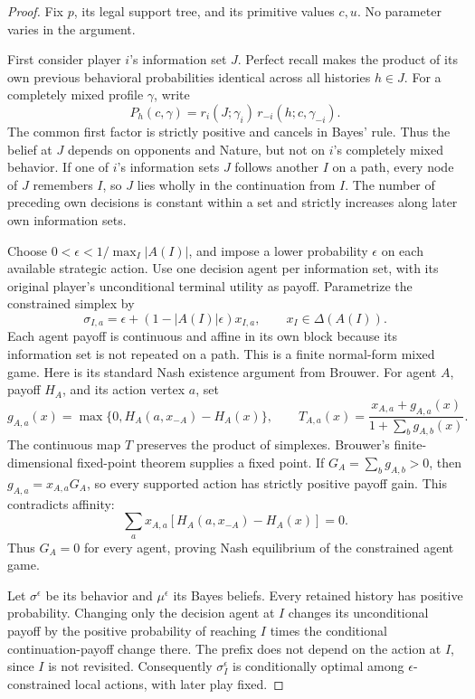 \documentclass[11pt,a4paper]{article}
\numberwithin{equation}{section}
\theoremstyle{definition}
\begin{document}
\begin{proof}
Fix \(p\), its legal support tree, and its primitive values \(c,u\).
No parameter varies in the argument.

First consider player \(i\)'s information set \(J\).
Perfect recall makes the product of its own previous behavioral
probabilities identical across all histories \(h\in J\).
For a completely mixed profile \(\gamma\), write
\[
 P_h(c,\gamma)
 =r_i(J;\gamma_i)\,r_{-i}(h;c,\gamma_{-i}).
\]
The common first factor is strictly positive and cancels in Bayes'
rule. Thus the belief at \(J\) depends on opponents and Nature, but
not on \(i\)'s completely mixed behavior.
If one of \(i\)'s information sets \(J\) follows another \(I\) on a
path, every node of \(J\) remembers \(I\), so \(J\) lies wholly in
the continuation from \(I\).
The number of preceding own decisions is constant within a set and
strictly increases along later own information sets.

Choose \(0<\epsilon<1/\max_I|A(I)|\), and impose a lower probability
\(\epsilon\) on each available strategic action.
Use one decision agent per information set, with its original
player's unconditional terminal utility as payoff.
Parametrize the constrained simplex by
\[
 \sigma_{I,a}=\epsilon+(1-|A(I)|\epsilon)x_{I,a},
 \qquad x_I\in\Delta(A(I)).
\]
Each agent payoff is continuous and affine in its own block because
its information set is not repeated on a path.
This is a finite normal-form mixed game.
Here is its standard Nash existence argument from Brouwer.
For agent \(A\), payoff \(H_A\), and its action vertex \(a\), set
\[
 g_{A,a}(x)=\max\{0,H_A(a,x_{-A})-H_A(x)\},\qquad
 T_{A,a}(x)=\frac{x_{A,a}+g_{A,a}(x)}
                   {1+\sum_b g_{A,b}(x)}.
\]
The continuous map \(T\) preserves the product of simplexes.
Brouwer's finite-dimensional fixed-point theorem supplies a fixed
point. If \(G_A=\sum_b g_{A,b}>0\), then
\(g_{A,a}=x_{A,a}G_A\), so every supported action has strictly
positive payoff gain. This contradicts affinity:
\[
 \sum_a x_{A,a}[H_A(a,x_{-A})-H_A(x)]=0.
\]
Thus \(G_A=0\) for every agent, proving Nash equilibrium of the
constrained agent game.

Let \(\sigma^\epsilon\) be its behavior and \(\mu^\epsilon\) its Bayes
beliefs. Every retained history has positive probability.
Changing only the decision agent at \(I\) changes its unconditional
payoff by the positive probability of reaching \(I\) times the
conditional continuation-payoff change there.
The prefix does not depend on the action at \(I\), since \(I\)
is not revisited. Consequently \(\sigma_I^\epsilon\) is conditionally
optimal among \(\epsilon\)-constrained local actions, with later play fixed.


\end{proof}
\end{document}
